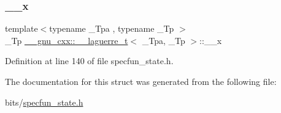 \subsubsection{\texorpdfstring{\+\_\+\+\_\+x}{\_\_x}}
{\footnotesize\ttfamily template$<$typename \+\_\+\+Tpa , typename \+\_\+\+Tp $>$ \\
\+\_\+\+Tp \hyperlink{struct____gnu__cxx_1_1____laguerre__t}{\+\_\+\+\_\+gnu\+\_\+cxx\+::\+\_\+\+\_\+laguerre\+\_\+t}$<$ \+\_\+\+Tpa, \+\_\+\+Tp $>$\+::\+\_\+\+\_\+x}



Definition at line 140 of file specfun\+\_\+state.\+h.



The documentation for this struct was generated from the following file\+:\begin{DoxyCompactItemize}
\item 
bits/\hyperlink{specfun__state_8h}{specfun\+\_\+state.\+h}\end{DoxyCompactItemize}

